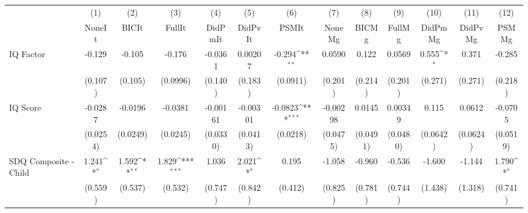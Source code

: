 {
\def\sym#1{\ifmmode^{#1}\else\(^{#1}\)\fi}
\begin{tabular}{l*{12}{c}}
\toprule
            &\multicolumn{1}{c}{(1)}&\multicolumn{1}{c}{(2)}&\multicolumn{1}{c}{(3)}&\multicolumn{1}{c}{(4)}&\multicolumn{1}{c}{(5)}&\multicolumn{1}{c}{(6)}&\multicolumn{1}{c}{(7)}&\multicolumn{1}{c}{(8)}&\multicolumn{1}{c}{(9)}&\multicolumn{1}{c}{(10)}&\multicolumn{1}{c}{(11)}&\multicolumn{1}{c}{(12)}\\
            &\multicolumn{1}{c}{NoneIt}&\multicolumn{1}{c}{BICIt}&\multicolumn{1}{c}{FullIt}&\multicolumn{1}{c}{DidPmIt}&\multicolumn{1}{c}{DidPvIt}&\multicolumn{1}{c}{PSMIt}&\multicolumn{1}{c}{NoneMg}&\multicolumn{1}{c}{BICMg}&\multicolumn{1}{c}{FullMg}&\multicolumn{1}{c}{DidPmMg}&\multicolumn{1}{c}{DidPvMg}&\multicolumn{1}{c}{PSMMg}\\
\midrule
IQ Factor   &      -0.129         &      -0.105         &      -0.176         &     -0.0361         &     0.00207         &      -0.294\sym{**} &      0.0590         &       0.122         &      0.0569         &       0.555\sym{*}  &       0.371         &      -0.285         \\
            &     (0.107)         &     (0.105)         &    (0.0996)         &     (0.140)         &     (0.183)         &    (0.0911)         &     (0.201)         &     (0.214)         &     (0.201)         &     (0.271)         &     (0.271)         &     (0.218)         \\
\addlinespace
IQ Score    &     -0.0287         &     -0.0196         &     -0.0381         &    -0.00161         &    -0.00301         &     -0.0823\sym{***}&    -0.00298         &      0.0145         &     0.00349         &       0.115         &      0.0612         &     -0.0705         \\
            &    (0.0254)         &    (0.0249)         &    (0.0245)         &    (0.0330)         &    (0.0413)         &    (0.0218)         &    (0.0475)         &    (0.0491)         &    (0.0480)         &    (0.0642)         &    (0.0624)         &    (0.0519)         \\
\addlinespace
SDQ Composite - Child&       1.241\sym{*}  &       1.592\sym{**} &       1.829\sym{***}&       1.036         &       2.021\sym{*}  &       0.195         &      -1.058         &      -0.960         &      -0.536         &      -1.600         &      -1.144         &       1.790\sym{*}  \\
            &     (0.559)         &     (0.537)         &     (0.532)         &     (0.747)         &     (0.842)         &     (0.412)         &     (0.825)         &     (0.781)         &     (0.744)         &     (1.438)         &     (1.318)         &     (0.741)         \\

\end{tabular}}
